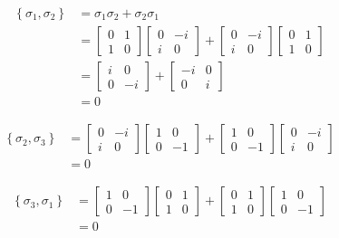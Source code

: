 \begin{align*}
\left\{\sigma_1, \sigma_2 \right\} &=\sigma_1 \sigma_2 + \sigma_2 \sigma_1\\	
&= \begin{bmatrix}
0 & 1 \\ 
1 & 0
\end{bmatrix}
\begin{bmatrix}
0 & -i \\ 
i & 0
\end{bmatrix}
+
\begin{bmatrix}
0 & -i \\ 
i & 0
\end{bmatrix}
\begin{bmatrix}
0 & 1 \\ 
1 & 0
\end{bmatrix} \\
%
&=
%
\begin{bmatrix}
i & 0 \\ 
0 & -i
\end{bmatrix}
+
\begin{bmatrix}
-i & 0 \\ 
0 & i
\end{bmatrix}\\
%
&= 0
\end{align*}



\begin{align*}
\left\{\sigma_2, \sigma_3 \right\} &= \begin{bmatrix}
0 & -i \\ 
i & 0
\end{bmatrix}
\begin{bmatrix}
1 & 0 \\ 
0 & -1
\end{bmatrix}
+
\begin{bmatrix}
1 & 0 \\ 
0 & -1
\end{bmatrix}
\begin{bmatrix}
0 & -i \\ 
i & 0
\end{bmatrix}\\
&=0
\end{align*}



\begin{align*}
\left\{\sigma_3, \sigma_1 \right\} &= \begin{bmatrix}
1 & 0 \\ 
0 & -1
\end{bmatrix}
\begin{bmatrix}
0 & 1 \\ 
1 & 0
\end{bmatrix}
+
\begin{bmatrix}
0 & 1 \\ 
1 & 0
\end{bmatrix}
\begin{bmatrix}
1 & 0 \\ 
0 & -1
\end{bmatrix}\\
&=0
\end{align*}

